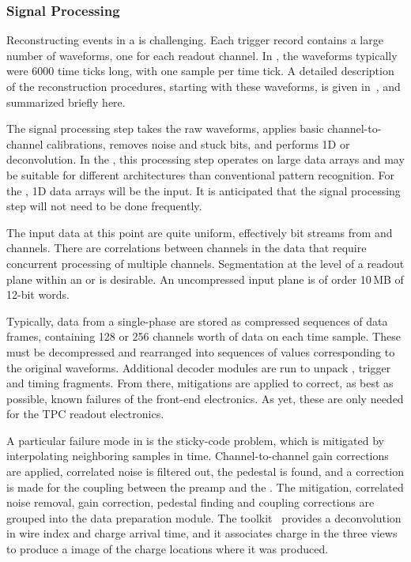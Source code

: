 \documentclass[../main-v1.tex]{subfiles}
\begin{document}
\subsubsection{Signal Processing }

Reconstructing events in a  is challenging.  Each trigger record contains a large number of waveforms, one for each readout channel.  In , the waveforms typically were 6000 time ticks long, with one  sample per time tick.  A detailed description of the reconstruction procedures, starting with these waveforms, is given in~\cite{Abi:2020mwi}, and summarized briefly here.


The signal processing step takes the raw waveforms, applies  basic channel-to-channel calibrations, removes noise and stuck bits, and performs 1D or \twod deconvolution.   In the , this processing step operates on large \twod data arrays and may be suitable for different architectures than conventional pattern recognition. For the , 1D data arrays will be the input. It is anticipated that the signal processing step will not need to be done frequently. 

The input data at this point are quite uniform, effectively bit streams from  and  channels.  There are correlations between channels in the  data that require concurrent processing of multiple channels.  Segmentation at the level of a readout plane within an   or  is desirable.  An uncompressed input  plane is of order 10\,MB of 12-bit words. 



Typically, data from a single-phase   are stored as compressed sequences of data frames, containing 128 or 256 channels worth of data on each time sample.  These must be decompressed and rearranged into sequences of  values corresponding to the original waveforms.  Additional decoder modules are run to unpack ,  trigger and timing  fragments.
From there, mitigations are applied to correct, as best as possible, known failures of the front-end electronics.  As yet, these are only needed for the TPC readout electronics.  

A particular failure mode in  is the sticky-code problem, which is mitigated by interpolating neighboring  samples in time.  Channel-to-channel gain corrections are applied, correlated noise is filtered out, the pedestal is found, and a correction is made for the  coupling between the preamp and the .  The  mitigation, correlated noise removal, gain correction, pedestal finding and  coupling corrections are grouped into the data preparation module.  The  toolkit~\cite{wirecell,ref:wire_cell_toolkit,ref:pdune_signal_processing} provides a \twod deconvolution in wire index and charge arrival time, and it associates charge in the three views to produce a \threed image of the charge locations where it was produced.  
\end{document}
